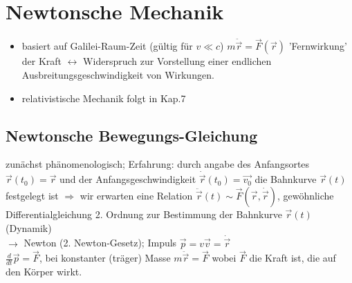 \section{Newtonsche Mechanik}
\begin{itemize}
\item basiert auf Galilei-Raum-Zeit (gültig für $v\ll c$) $m\ddot{\vec{r}}=\vec{F}(\vec{r})$ 'Fernwirkung' der Kraft $\leftrightarrow$ Widerspruch zur Vorstellung einer endlichen Ausbreitungsgeschwindigkeit von Wirkungen.
\item relativistische Mechanik folgt in Kap.7 
\end{itemize}
\subsection{Newtonsche Bewegungs-Gleichung}
zunächst phänomenologisch; Erfahrung: durch angabe des Anfangsortes $\vec{r}(t_0)=\vec{r}$ und der Anfangsgeschwindigkeit $\dot{\vec{r}}(t_0)=\vec{v_0}$ die Bahnkurve $\vec{r}(t)$ festgelegt ist $\Rightarrow$ wir erwarten eine Relation $\ddot{\vec{r}}(t) \sim \vec{F}(\vec{r},\dot{\vec{r}})$, gewöhnliche Differentialgleichung 2. Ordnung zur Bestimmung der Bahnkurve $\vec{r}(t)$ (Dynamik)\\
$\rightarrow$ Newton (2. Newton-Gesetz); Impuls $\vec{p}=v\vec{v}=\dot{\vec{r}}$\\
$\frac{d}{dt}\vec{p}=\vec{F}$, bei konstanter (träger) Masse $m\ddot{\vec{r}}=\vec{F}$ wobei $\vec{F}$ die Kraft ist, die auf den Körper wirkt.\\
